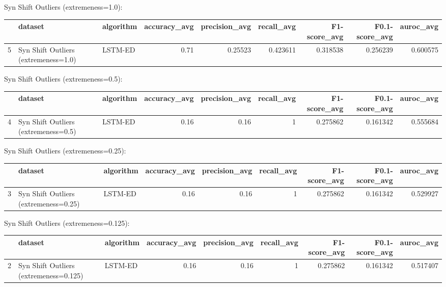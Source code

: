 Syn Shift Outliers (extremeness=1.0):

\begin{tabular}{rllrrrrrr}
\hline
    & dataset                              & algorithm   &   accuracy\_avg &   precision\_avg &   recall\_avg &   F1-score\_avg &   F0.1-score\_avg &   auroc\_avg \\
\hline
  5 & Syn Shift Outliers (extremeness=1.0) & LSTM-ED     &           0.71 &         0.25523 &     0.423611 &       0.318538 &         0.256239 &    0.600575 \\
\hline
\end{tabular}

Syn Shift Outliers (extremeness=0.5):

\begin{tabular}{rllrrrrrr}
\hline
    & dataset                              & algorithm   &   accuracy\_avg &   precision\_avg &   recall\_avg &   F1-score\_avg &   F0.1-score\_avg &   auroc\_avg \\
\hline
  4 & Syn Shift Outliers (extremeness=0.5) & LSTM-ED     &           0.16 &            0.16 &            1 &       0.275862 &         0.161342 &    0.555684 \\
\hline
\end{tabular}

Syn Shift Outliers (extremeness=0.25):

\begin{tabular}{rllrrrrrr}
\hline
    & dataset                               & algorithm   &   accuracy\_avg &   precision\_avg &   recall\_avg &   F1-score\_avg &   F0.1-score\_avg &   auroc\_avg \\
\hline
  3 & Syn Shift Outliers (extremeness=0.25) & LSTM-ED     &           0.16 &            0.16 &            1 &       0.275862 &         0.161342 &    0.529927 \\
\hline
\end{tabular}

Syn Shift Outliers (extremeness=0.125):

\begin{tabular}{rllrrrrrr}
\hline
    & dataset                                & algorithm   &   accuracy\_avg &   precision\_avg &   recall\_avg &   F1-score\_avg &   F0.1-score\_avg &   auroc\_avg \\
\hline
  2 & Syn Shift Outliers (extremeness=0.125) & LSTM-ED     &           0.16 &            0.16 &            1 &       0.275862 &         0.161342 &    0.517407 \\
\hline
\end{tabular}

